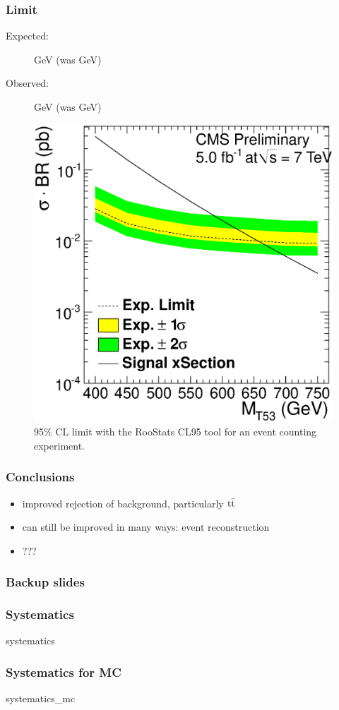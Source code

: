 \documentclass[ukenglish]{beamer}
\begin{document}
\begin{frame}
    \frametitle{Limit}
    \begin{description}
        \item[Expected:] \unit[658]{GeV} (was \unit[645]{GeV})
        \item[Observed:] \unit[633]{GeV} (was \unit[645]{GeV})
    \end{description}
    \begin{figure}[h]
        \centering
    \includegraphics[height=.6\textheight]{oLimit_limit_macro_4jets_opt_btag_200_350_02.eps}
        \caption{95\% CL limit with the RooStats CL95 tool for an event
        counting experiment.}
    \end{figure}
\end{frame}

\begin{frame}
    \frametitle{Conclusions}
    \begin{itemize}
        \item improved rejection of background, particularly $\mathrm{t}\bar{\mathrm{t}}$
        \item can still be improved in many ways: event reconstruction
        \item ???
    \end{itemize}
\end{frame}

\begin{frame}
    \frametitle{Backup slides}
\end{frame}

\begin{frame}
    \frametitle{Systematics}
    {systematics}
\end{frame}

\begin{frame}
    \frametitle{Systematics for MC}
    {systematics_mc}
\end{frame}
\end{document}
